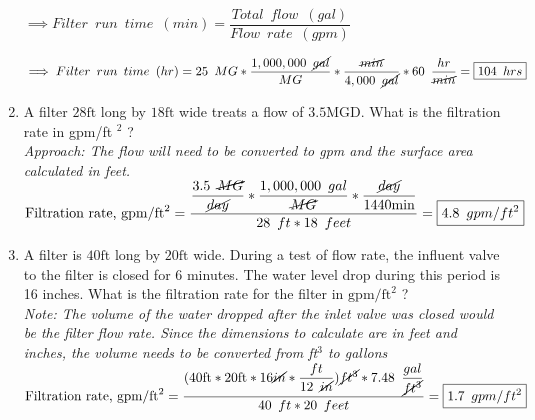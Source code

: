 \documentclass{article}
\begin{document}
\begin{enumerate}
\vspace{0.3cm}

$\implies Filter \enspace run \enspace time \enspace (min)=\dfrac{Total \enspace flow \enspace (gal)}{Flow \enspace rate \enspace (gpm)}$\\

\vspace{0.3cm}

$\implies Filter \enspace run \enspace time \enspace (hr)=25 \enspace MG*\dfrac{1,000,000 \enspace \cancel{gal}}{MG}*\dfrac{\cancel{min}}{4,000 \enspace \cancel{gal}}*60 \enspace \dfrac{hr}{\cancel{min}}=\boxed{104 \enspace hrs}$

\item A filter $28 \mathrm{ft}$ long by $18 \mathrm{ft}$ wide treats a flow of $3.5 \mathrm{MGD}$. What is the filtration rate in gpm/ft ${ }^{2}$ ?\\

\vspace{0.2cm}
\textit{Approach:  The flow will need to be converted to gpm and the surface area calculated in feet.}\\

$\text{Filtration rate, } \mathrm{gpm} / \mathrm{ft}^{2} = 
\dfrac{
\dfrac{3.5 \enspace \cancel{MG}}{ \cancel{day}} * \dfrac{1,000,000 \enspace gal}{\cancel{MG}}
*\dfrac{\cancel{day}}{1440 \mathrm{ min}}}
{28 \enspace ft * 18 \enspace feet}= \boxed{4.8 \enspace gpm/ft^2}$\\
\vspace{0.2cm}
\item A filter is $40 \mathrm{ft}$ long by $20 \mathrm{ft}$ wide. During a test of flow rate, the influent valve to the filter is closed for 6 minutes. The water level drop during this period is 16 inches. What is the filtration rate for the filter in $\mathrm{gpm} / \mathrm{ft}^{2}$ ?\\
\vspace{0.2cm}
\textit{Note:  The volume of the water dropped after the inlet valve was closed would be the filter flow rate.  Since the dimensions to calculate are in feet and inches, the volume needs to be converted from ft$^3$ to gallons}\\
\vspace{0.2cm}
$\text{Filtration rate, } \mathrm{gpm} / \mathrm{ft}^{2} = 
\dfrac{(
40 \mathrm{ ft}*20 \mathrm{ ft} * 16 \mathrm{\cancel{in}}*
\dfrac{ft}{12 \enspace \cancel{in}}
)
\cancel{ft^3}*7.48 \enspace 
\dfrac
{gal}
{\cancel{ft^3}}}
{40 \enspace ft * 20 \enspace feet}= \boxed{1.7\enspace gpm/ft^2}$\\


\end{enumerate}
\end{document}
